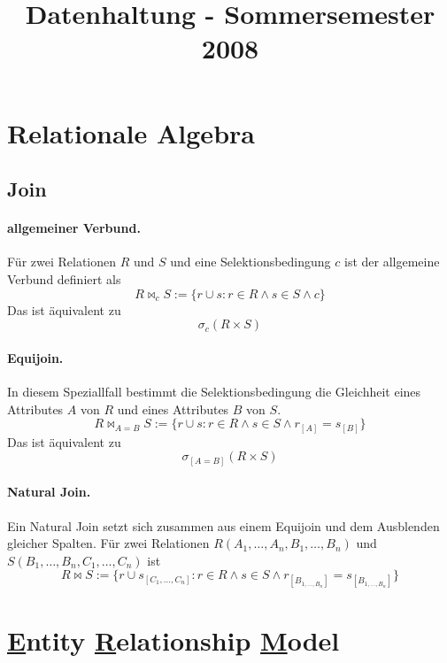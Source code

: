 \documentclass[]{scrartcl}
\begin{document}
\title{Datenhaltung - Sommersemester 2008}

\author{}



\maketitle
\tableofcontents

\section{Relationale Algebra}

\subsection{Join}

\paragraph{allgemeiner Verbund.} F\"ur zwei Relationen $R$ und $S$ und eine Selektionsbedingung $c$ ist der allgemeine Verbund definiert als
$$ R \bowtie_{c} S := \{ r \cup s : r \in R \wedge s \in S \wedge c \} $$
Das ist \"aquivalent zu 
$$ \sigma_{c} (R \times S)$$

\paragraph{Equijoin. } In diesem Speziallfall bestimmt die Selektionsbedingung die Gleichheit eines Attributes $A$ von $R$ und eines Attributes $B$ von $S$.
$$R \bowtie_{A = B} S := \{ r \cup s : r \in R \wedge s \in S \wedge r_{[A]} = s_{[B]} \}$$
Das ist \"aquivalent zu 
$$ \sigma_{[A = B]} (R \times S)$$

\paragraph{Natural Join.} Ein Natural Join setzt sich zusammen aus einem Equijoin und dem Ausblenden gleicher Spalten. F\"ur zwei Relationen $R(A_{1},\dots, A_{n},B_{1},\dots,B_{n})$ und $S(B_{1},\dots,B_{n},C_{1},\dots,C_{n})$ ist
$$R \bowtie S := \{ r \cup s_{[C_{1}, \dots, C_{n}]} : r \in R \wedge s \in S \wedge r_{[B_{1, \dots, B_{n}}]} = s_{[B_{1, \dots, B_{n}}]} \}$$



\section{\underline{E}ntity \underline{R}elationship \underline{M}odel }
\end{document}
